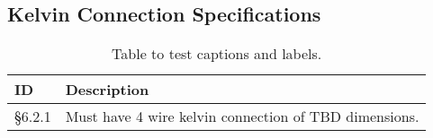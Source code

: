 \subsection{Kelvin Connection Specifications} \label{subsec:KelvinConnectionSpecifications}


\begin{table}[H]
    \begin{tabular}{|m{3.5em}|m{30em}|}
    \hline
      \textbf{ID} &   \textbf{Description}   \\ \hline
      §6.2.1 & Must have 4 wire kelvin connection of TBD dimensions.\\ \hline
    \end{tabular}
    \caption{Table to test captions and labels.}
    \label{tab:6_2_1KCSpec}
  \end{table}